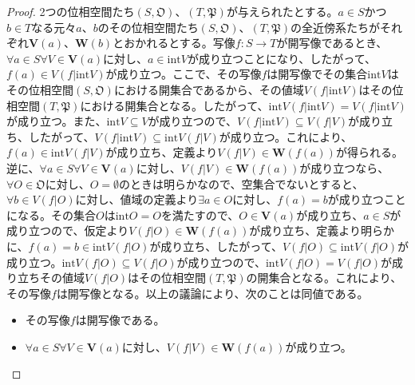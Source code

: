 \documentclass[dvipdfmx]{jsarticle}
\begin{document}
\begin{proof}
2つの位相空間たち$\left( S,\mathfrak{O} \right)$、$\left( T,\mathfrak{P} \right)$が与えられたとする。$a \in S$かつ$b \in T$なる元々$a$、$b$のその位相空間たち$\left( S,\mathfrak{O} \right)$、$\left( T,\mathfrak{P} \right)$の全近傍系たちがそれぞれ$\mathbf{V}(a)$、$\mathbf{W}(b)$とおかれるとする。写像$f:S \rightarrow T$が開写像であるとき、$\forall a \in S\forall V \in \mathbf{V}(a)$に対し、$a \in {\mathrm{int}}V$が成り立つことになり、したがって、$f(a) \in V\left( f|{\mathrm{int}}V \right)$が成り立つ。ここで、その写像$f$は開写像でその集合${\mathrm{int}}V$はその位相空間$\left( S,\mathfrak{O} \right)$における開集合であるから、その値域$V\left( f|{\mathrm{int}}V \right)$はその位相空間$\left( T,\mathfrak{P} \right)$における開集合となる。したがって、${\mathrm{int}}{V\left( f|{\mathrm{int}}V \right)} = V\left( f|{\mathrm{int}}V \right)$が成り立つ。また、${\mathrm{int}}V \subseteq V$が成り立つので、$V\left( f|{\mathrm{int}}V \right) \subseteq V\left( f|V \right)$が成り立ち、したがって、$V\left( f|{\mathrm{int}}V \right) \subseteq {\mathrm{int}}{V\left( f|V \right)}$が成り立つ。これにより、$f(a) \in {\mathrm{int}}{V\left( f|V \right)}$が成り立ち、定義より$V\left( f|V \right) \in \mathbf{W}\left( f(a) \right)$が得られる。逆に、$\forall a \in S\forall V \in \mathbf{V}(a)$に対し、$V\left( f|V \right) \in \mathbf{W}\left( f(a) \right)$が成り立つなら、$\forall O \in \mathfrak{O}$に対し、$O = \emptyset$のときは明らかなので、空集合でないとすると、$\forall b \in V\left( f|O \right)$に対し、値域の定義より$\exists a \in O$に対し、$f(a) = b$が成り立つことになる。その集合$O$は${\mathrm{int}}O = O$を満たすので、$O \in \mathbf{V}(a)$が成り立ち、$a \in S$が成り立つので、仮定より$V\left( f|O \right) \in \mathbf{W}\left( f(a) \right)$が成り立ち、定義より明らかに、$f(a) = b \in {\mathrm{int}}{V\left( f|O \right)}$が成り立ち、したがって、$V\left( f|O \right) \subseteq {\mathrm{int}}{V\left( f|O \right)}$が成り立つ。${\mathrm{int}}{V\left( f|O \right)} \subseteq V\left( f|O \right)$が成り立つので、${\mathrm{int}}{V\left( f|O \right)} = V\left( f|O \right)$が成り立ちその値域$V\left( f|O \right)$はその位相空間$\left( T,\mathfrak{P} \right)$の開集合となる。これにより、その写像$f$は開写像となる。以上の議論により、次のことは同値である。
\begin{itemize}
\item
  その写像$f$は開写像である。
\item
  $\forall a \in S\forall V \in \mathbf{V}(a)$に対し、$V\left( f|V \right) \in \mathbf{W}\left( f(a) \right)$が成り立つ。
\end{itemize}\par

\end{proof}
\end{document}

